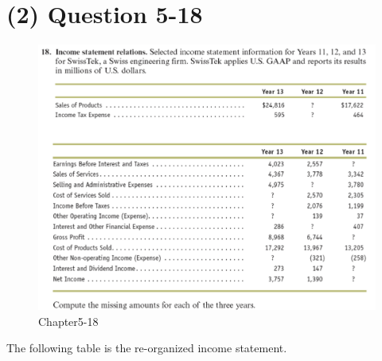 \documentclass[
  a4paper,
  DIV=11,
  numbers=noendperiod]{scrreprt}
\begin{document}
\section*{(2) Question 5-18}\label{question-5-18}


\begin{figure}[H]

{\centering \includegraphics{images/재무회계_5-18.png}

}

\caption{Chapter5-18}

\end{figure}%

The following table is the re-organized income statement.
\end{document}
